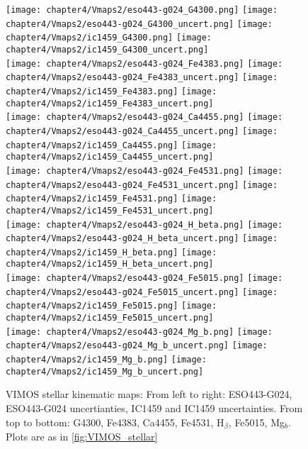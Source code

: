 \begin{figure*}
	\centering
	\texttt{[image: chapter4/Vmaps2/eso443-g024\_G4300.png]}
	\texttt{[image: chapter4/Vmaps2/eso443-g024\_G4300\_uncert.png]}
	\texttt{[image: chapter4/Vmaps2/ic1459\_G4300.png]}
	\texttt{[image: chapter4/Vmaps2/ic1459\_G4300\_uncert.png]}
	\\
	\texttt{[image: chapter4/Vmaps2/eso443-g024\_Fe4383.png]}
	\texttt{[image: chapter4/Vmaps2/eso443-g024\_Fe4383\_uncert.png]}
	\texttt{[image: chapter4/Vmaps2/ic1459\_Fe4383.png]}
	\texttt{[image: chapter4/Vmaps2/ic1459\_Fe4383\_uncert.png]}
	\\
	\texttt{[image: chapter4/Vmaps2/eso443-g024\_Ca4455.png]}
	\texttt{[image: chapter4/Vmaps2/eso443-g024\_Ca4455\_uncert.png]}
	\texttt{[image: chapter4/Vmaps2/ic1459\_Ca4455.png]}
	\texttt{[image: chapter4/Vmaps2/ic1459\_Ca4455\_uncert.png]}
	\\
	\texttt{[image: chapter4/Vmaps2/eso443-g024\_Fe4531.png]}
	\texttt{[image: chapter4/Vmaps2/eso443-g024\_Fe4531\_uncert.png]}
	\texttt{[image: chapter4/Vmaps2/ic1459\_Fe4531.png]}
	\texttt{[image: chapter4/Vmaps2/ic1459\_Fe4531\_uncert.png]}
	\\
	\texttt{[image: chapter4/Vmaps2/eso443-g024\_H\_beta.png]}
	\texttt{[image: chapter4/Vmaps2/eso443-g024\_H\_beta\_uncert.png]}
	\texttt{[image: chapter4/Vmaps2/ic1459\_H\_beta.png]}
	\texttt{[image: chapter4/Vmaps2/ic1459\_H\_beta\_uncert.png]}
	\\
	\texttt{[image: chapter4/Vmaps2/eso443-g024\_Fe5015.png]}
	\texttt{[image: chapter4/Vmaps2/eso443-g024\_Fe5015\_uncert.png]}
	\texttt{[image: chapter4/Vmaps2/ic1459\_Fe5015.png]}
	\texttt{[image: chapter4/Vmaps2/ic1459\_Fe5015\_uncert.png]}
	\\
	\texttt{[image: chapter4/Vmaps2/eso443-g024\_Mg\_b.png]}
	\texttt{[image: chapter4/Vmaps2/eso443-g024\_Mg\_b\_uncert.png]}
	\texttt{[image: chapter4/Vmaps2/ic1459\_Mg\_b.png]}
	\texttt{[image: chapter4/Vmaps2/ic1459\_Mg\_b\_uncert.png]}
	\\
	\caption[VIMOS absorption line strength maps]{VIMOS stellar kinematic maps: From left to right: ESO443-G024, ESO443-G024 uncertianties, IC1459 and IC1459 uncertainties. From top to bottom: G4300, Fe4383, Ca4455, Fe4531, H$_\beta$, Fe5015, Mg$_b$. Plots are as in \ref{fig:VIMOS_stellar}}
	\label{fig:VIMOS_absorption}
\end{figure*}

